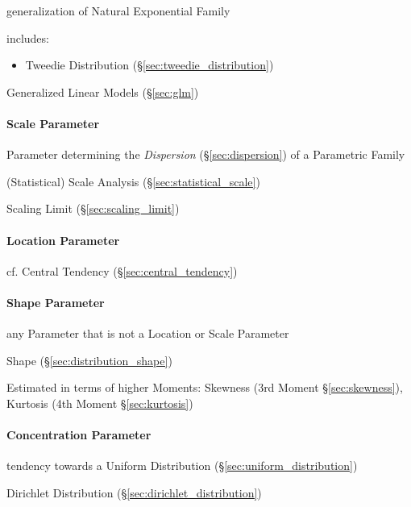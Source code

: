 generalization of Natural Exponential Family

includes:
\begin{itemize}
  \item Tweedie Distribution (\S\ref{sec:tweedie_distribution})
\end{itemize}

Generalized Linear Models (\S\ref{sec:glm})



\paragraph{Scale Parameter}\label{sec:scale_parameter}\hfill

Parameter determining the \emph{Dispersion} (\S\ref{sec:dispersion}) of a
Parametric Family

\fist (Statistical) Scale Analysis (\S\ref{sec:statistical_scale})

\fist Scaling Limit (\S\ref{sec:scaling_limit})



\paragraph{Location Parameter}\label{sec:location_parameter}\hfill

cf. Central Tendency (\S\ref{sec:central_tendency})



\paragraph{Shape Parameter}\label{sec:shape_parameter}\hfill

any Parameter that is not a Location or Scale Parameter

\fist Shape (\S\ref{sec:distribution_shape})

Estimated in terms of higher Moments: Skewness (3rd Moment
\S\ref{sec:skewness}), Kurtosis (4th Moment \S\ref{sec:kurtosis})



\paragraph{Concentration Parameter}\label{sec:concentration_parameter}\hfill

tendency towards a Uniform Distribution (\S\ref{sec:uniform_distribution})

Dirichlet Distribution (\S\ref{sec:dirichlet_distribution})



